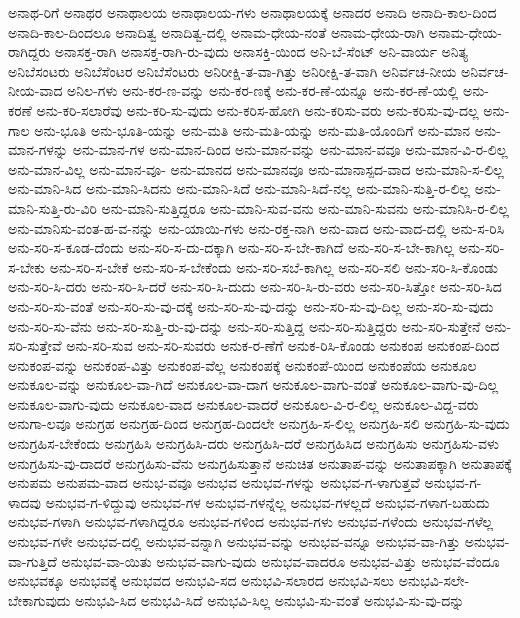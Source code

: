 {ಅನಾಥ-ರಿಗೆ
ಅನಾಥರ
ಅನಾಥಾಲಯ
ಅನಾಥಾಲಯ-ಗಳು
ಅನಾಥಾಲಯಕ್ಕೆ
ಅನಾದರ
ಅನಾದಿ
ಅನಾದಿ-ಕಾಲ-ದಿಂದ
ಅನಾದಿ-ಕಾಲ-ದಿಂದಲೂ
ಅನಾದಿತ್ವ
ಅನಾದಿತ್ವ-ದಲ್ಲಿ
ಅನಾಮ-ಧೇಯ-ನಂತೆ
ಅನಾಮ-ಧೇಯ-ರಾಗಿ
ಅನಾಮ-ಧೇಯ-ರಾಗಿದ್ದರು
ಅನಾಸಕ್ತ-ರಾಗಿ
ಅನಾಸಕ್ತ-ರಾಗಿ-ರು-ವುದು
ಅನಾಸಕ್ತಿ-ಯಿಂದ
ಅನಿ-ಬೆ-ಸೆಂಟ್
ಅನಿ-ವಾರ್ಯ
ಅನಿತ್ಯ
ಅನಿಬೆಸಂಟರು
ಅನಿಬೆಸೆಂಟರ
ಅನಿಬೆಸೆಂಟರು
ಅನಿರೀಕ್ಷಿ-ತ-ವಾ-ಗಿತ್ತು
ಅನಿರೀಕ್ಷಿ-ತ-ವಾಗಿ
ಅನಿರ್ವಚ-ನೀಯ
ಅನಿರ್ವಚ-ನೀಯ-ವಾದ
ಅನಿಲ-ಗಳು
ಅನು-ಕರ-ಣ-ವನ್ನು
ಅನು-ಕರ-ಣಕ್ಕೆ
ಅನು-ಕರ-ಣೆ-ಯನ್ನೂ
ಅನು-ಕರ-ಣೆ-ಯಲ್ಲಿ
ಅನು-ಕರಣೆ
ಅನು-ಕರಿ-ಸಲಾರೆವು
ಅನು-ಕರಿ-ಸು-ವುದು
ಅನು-ಕರಿಸ-ಹೋಗಿ
ಅನು-ಕರಿಸು-ವರು
ಅನು-ಕರಿಸು-ವು-ದಲ್ಲ
ಅನು-ಗಾಲ
ಅನು-ಭೂತಿ
ಅನು-ಭೂತಿ-ಯನ್ನು
ಅನು-ಮತಿ
ಅನು-ಮತಿ-ಯನ್ನು
ಅನು-ಮತಿ-ಯೊಂದಿಗೆ
ಅನು-ಮಾನ
ಅನು-ಮಾನ-ಗಳನ್ನು
ಅನು-ಮಾನ-ಗಳ
ಅನು-ಮಾನ-ದಿಂದ
ಅನು-ಮಾನ-ವನ್ನು
ಅನು-ಮಾನ-ವವೂ
ಅನು-ಮಾನ-ವಿ-ರ-ಲಿಲ್ಲ
ಅನು-ಮಾನ-ವಿಲ್ಲ
ಅನು-ಮಾನ-ವೂ-
ಅನು-ಮಾನದ
ಅನು-ಮಾನವೂ
ಅನು-ಮಾನಾಸ್ಪದ-ವಾದ
ಅನು-ಮಾನಿ-ಸ-ಲಿಲ್ಲ
ಅನು-ಮಾನಿ-ಸಿದ
ಅನು-ಮಾನಿ-ಸಿದನು
ಅನು-ಮಾನಿ-ಸಿದೆ
ಅನು-ಮಾನಿ-ಸಿದೆ-ನಲ್ಲ
ಅನು-ಮಾನಿ-ಸುತ್ತಿ-ರ-ಲಿಲ್ಲ
ಅನು-ಮಾನಿ-ಸುತ್ತಿ-ರು-ವಿರಿ
ಅನು-ಮಾನಿ-ಸುತ್ತಿದ್ದರೂ
ಅನು-ಮಾನಿ-ಸುವ-ವನು
ಅನು-ಮಾನಿ-ಸುವನು
ಅನು-ಮಾನಿಸಿ-ರ-ಲಿಲ್ಲ
ಅನು-ಮಾನಿಸು-ವಂತ-ಹ-ವ-ನನ್ನು
ಅನು-ಯಾಯಿ-ಗಳು
ಅನು-ರಕ್ತ-ನಾಗಿ
ಅನು-ವಾದ
ಅನು-ವಾದ-ದಲ್ಲಿ
ಅನು-ಸ-ರಿಸಿ
ಅನು-ಸರಿ-ಸ-ಕೂಡ-ದೆಂದು
ಅನು-ಸರಿ-ಸ-ದು-ದಕ್ಕಾಗಿ
ಅನು-ಸರಿ-ಸ-ಬೇ-ಕಾಗಿದೆ
ಅನು-ಸರಿ-ಸ-ಬೇ-ಕಾಗಿಲ್ಲ
ಅನು-ಸರಿ-ಸ-ಬೇಕು
ಅನು-ಸರಿ-ಸ-ಬೇಕೆ
ಅನು-ಸರಿ-ಸ-ಬೇಕೆಂದು
ಅನು-ಸರಿ-ಸಬೆ-ಕಾಗಿಲ್ಲ
ಅನು-ಸರಿ-ಸಲಿ
ಅನು-ಸರಿ-ಸಿ-ಕೊಂಡು
ಅನು-ಸರಿ-ಸಿ-ದರು
ಅನು-ಸರಿ-ಸಿ-ದರೆ
ಅನು-ಸರಿ-ಸಿ-ದುದು
ಅನು-ಸರಿ-ಸಿ-ರು-ವರು
ಅನು-ಸರಿ-ಸಿತ್ತೋ
ಅನು-ಸರಿ-ಸಿದ
ಅನು-ಸರಿ-ಸು-ವಂತೆ
ಅನು-ಸರಿ-ಸು-ವು-ದಕ್ಕೆ
ಅನು-ಸರಿ-ಸು-ವು-ದನ್ನು
ಅನು-ಸರಿ-ಸು-ವು-ದಿಲ್ಲ
ಅನು-ಸರಿ-ಸು-ವುದು
ಅನು-ಸರಿ-ಸು-ವೆನು
ಅನು-ಸರಿ-ಸುತ್ತಿ-ರು-ವು-ದನ್ನು
ಅನು-ಸರಿ-ಸುತ್ತಿದ್ದ
ಅನು-ಸರಿ-ಸುತ್ತಿದ್ದರು
ಅನು-ಸರಿ-ಸುತ್ತೇನೆ
ಅನು-ಸರಿ-ಸುತ್ತೇವೆ
ಅನು-ಸರಿ-ಸುವ
ಅನು-ಸರಿ-ಸುವರು
ಅನುಕ-ರ-ಣೆಗೆ
ಅನುಕ-ರಿಸಿ-ಕೊಂಡು
ಅನುಕಂಪ
ಅನುಕಂಪ-ದಿಂದ
ಅನುಕಂಪ-ವನ್ನು
ಅನುಕಂಪ-ವಿತ್ತು
ಅನುಕಂಪ-ವೆಲ್ಲ
ಅನುಕಂಪಕ್ಕೆ
ಅನುಕಂಪೆ-ಯಿಂದ
ಅನುಕಂಪೆಯ
ಅನುಕೂಲ
ಅನುಕೂಲ-ವನ್ನು
ಅನುಕೂಲ-ವಾ-ಗಿದೆ
ಅನುಕೂಲ-ವಾ-ದಾಗ
ಅನುಕೂಲ-ವಾಗು-ವಂತೆ
ಅನುಕೂಲ-ವಾಗು-ವು-ದಿಲ್ಲ
ಅನುಕೂಲ-ವಾಗು-ವುದು
ಅನುಕೂಲ-ವಾದ
ಅನುಕೂಲ-ವಾದರೆ
ಅನುಕೂಲ-ವಿ-ರ-ಲಿಲ್ಲ
ಅನುಕೂಲ-ವಿದ್ದ-ವರು
ಅನುಗಾ-ಲವೂ
ಅನುಗ್ರಹ
ಅನುಗ್ರಹ-ದಿಂದ
ಅನುಗ್ರಹ-ದಿಂದಲೇ
ಅನುಗ್ರಹಿ-ಸ-ಲಿಲ್ಲ
ಅನುಗ್ರಹಿ-ಸಲಿ
ಅನುಗ್ರಹಿ-ಸು-ವುದು
ಅನುಗ್ರಹಿಸ-ಬೇಕೆಂದು
ಅನುಗ್ರಹಿಸಿ
ಅನುಗ್ರಹಿಸಿ-ದರು
ಅನುಗ್ರಹಿಸಿ-ದರೆ
ಅನುಗ್ರಹಿಸಿದ
ಅನುಗ್ರಹಿಸು
ಅನುಗ್ರಹಿಸು-ವಳು
ಅನುಗ್ರಹಿಸು-ವು-ದಾದರೆ
ಅನುಗ್ರಹಿಸು-ವೆನು
ಅನುಗ್ರಹಿಸುತ್ತಾನೆ
ಅನುಚಿತ
ಅನುತಾಪ-ವನ್ನು
ಅನುತಾಪಕ್ಕಾಗಿ
ಅನುತಾಪಕ್ಕೆ
ಅನುಪಮ
ಅನುಪಮ-ವಾದ
ಅನುಭ-ವವೂ
ಅನುಭವ
ಅನುಭವ-ಗಳನ್ನು
ಅನುಭವ-ಗ-ಳಾಗುತ್ತವೆ
ಅನುಭವ-ಗ-ಳಾದವು
ಅನುಭವ-ಗ-ಳಿದ್ದುವು
ಅನುಭವ-ಗಳ
ಅನುಭವ-ಗಳನ್ನೆಲ್ಲ
ಅನುಭವ-ಗಳಲ್ಲದೆ
ಅನುಭವ-ಗಳಾಗ-ಬಹುದು
ಅನುಭವ-ಗಳಾಗಿ
ಅನುಭವ-ಗಳಾಗಿದ್ದರೂ
ಅನುಭವ-ಗಳಿಂದ
ಅನುಭವ-ಗಳು
ಅನುಭವ-ಗಳೆಂದು
ಅನುಭವ-ಗಳೆಲ್ಲ
ಅನುಭವ-ಗಳೇ
ಅನುಭವ-ದಲ್ಲಿ
ಅನುಭವ-ವನ್ನಾಗಿ
ಅನುಭವ-ವನ್ನು
ಅನುಭವ-ವನ್ನೂ
ಅನುಭವ-ವಾ-ಗಿತ್ತು
ಅನುಭವ-ವಾ-ಗುತ್ತಿದೆ
ಅನುಭವ-ವಾ-ಯಿತು
ಅನುಭವ-ವಾಗು-ವುದು
ಅನುಭವ-ವಾದರೂ
ಅನುಭವ-ವಿತ್ತು
ಅನುಭವ-ವೆಂದೂ
ಅನುಭವಕ್ಕೂ
ಅನುಭವಕ್ಕೆ
ಅನುಭವದ
ಅನುಭವಿ-ಸದ
ಅನುಭವಿ-ಸಲಾರದ
ಅನುಭವಿ-ಸಲು
ಅನುಭವಿ-ಸಲೇ-ಬೇಕಾಗುವುದು
ಅನುಭವಿ-ಸಿದ
ಅನುಭವಿ-ಸಿದೆ
ಅನುಭವಿ-ಸಿಲ್ಲ
ಅನುಭವಿ-ಸು-ವಂತೆ
ಅನುಭವಿ-ಸು-ವು-ದನ್ನು
}
